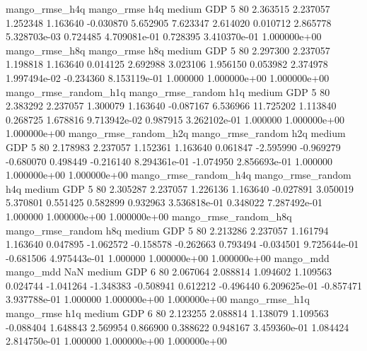        mango_rmse_h4q        mango_rmse                  h4q     medium      GDP                 5 80  2.363515       2.237057 1.252348       1.163640   -0.030870      5.652905      7.623347     2.614020       0.010712  2.865778 5.328703e-03     0.724485   4.709081e-01            0.728395    3.410370e-01        1.000000e+00
       mango_rmse_h8q        mango_rmse                  h8q     medium      GDP                 5 80  2.297300       2.237057 1.198818       1.163640    0.014125      2.692988      3.023106     1.956150       0.053982  2.374978 1.997494e-02    -0.234360   8.153119e-01            1.000000    1.000000e+00        1.000000e+00
mango_rmse_random_h1q mango_rmse_random                  h1q     medium      GDP                 5 80  2.383292       2.237057 1.300079       1.163640   -0.087167      6.536966     11.725202     1.113840       0.268725  1.678816 9.713942e-02     0.987915   3.262102e-01            1.000000    1.000000e+00        1.000000e+00
mango_rmse_random_h2q mango_rmse_random                  h2q     medium      GDP                 5 80  2.178983       2.237057 1.152361       1.163640    0.061847     -2.595990     -0.969279    -0.680070       0.498449 -0.216140 8.294361e-01    -1.074950   2.856693e-01            1.000000    1.000000e+00        1.000000e+00
mango_rmse_random_h4q mango_rmse_random                  h4q     medium      GDP                 5 80  2.305287       2.237057 1.226136       1.163640   -0.027891      3.050019      5.370801     0.551425       0.582899  0.932963 3.536818e-01     0.348022   7.287492e-01            1.000000    1.000000e+00        1.000000e+00
mango_rmse_random_h8q mango_rmse_random                  h8q     medium      GDP                 5 80  2.213286       2.237057 1.161794       1.163640    0.047895     -1.062572     -0.158578    -0.262663       0.793494 -0.034501 9.725644e-01    -0.681506   4.975443e-01            1.000000    1.000000e+00        1.000000e+00
            mango_mdd         mango_mdd                  NaN     medium      GDP                 6 80  2.067064       2.088814 1.094602       1.109563    0.024744     -1.041264     -1.348383    -0.508941       0.612212 -0.496440 6.209625e-01    -0.857471   3.937788e-01            1.000000    1.000000e+00        1.000000e+00
       mango_rmse_h1q        mango_rmse                  h1q     medium      GDP                 6 80  2.123255       2.088814 1.138079       1.109563   -0.088404      1.648843      2.569954     0.866900       0.388622  0.948167 3.459360e-01     1.084424   2.814750e-01            1.000000    1.000000e+00        1.000000e+00
